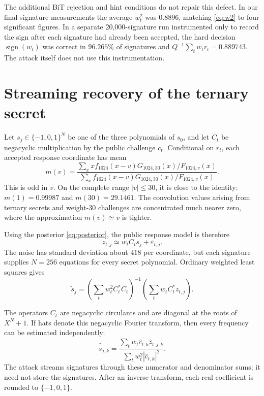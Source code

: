 \documentclass[11pt,a4paper]{article}
\begin{document}
The additional BiT rejection and hint conditions do not repair this defect.
In our final-signature measurements the average $w_t^2$ was $0.8896$, matching
\eqref{eq:w2} to four significant figures.  In a separate 20,000-signature
run instrumented only to record the sign after each signature had already been
accepted, the hard decision $\operatorname{sign}(w_t)$ was correct in
$96.265\%$ of signatures and $Q^{-1}\sum_t w_tr_t=0.889743$.  The attack itself
does not use this instrumentation.

\section{Streaming recovery of the ternary secret}

Let $s_j\in\{-1,0,1\}^{N}$ be one of the three polynomials of $s_0$, and let
$C_t$ be negacyclic multiplication by the public challenge $c_t$.  Conditional
on $r_t$, each accepted response coordinate has mean
\begin{equation}
 m(v)=
 \frac{\sum_x x f_{1024}(x-v)G_{1024,30}(x)/F_{1024,v}(x)}
      {\sum_x   f_{1024}(x-v)G_{1024,30}(x)/F_{1024,v}(x)}.
 \label{eq:m-v}
\end{equation}
This is odd in $v$.  On the complete range $|v|\leq30$, it is close to the
identity: $m(1)=0.99987$ and $m(30)=29.1461$.  The convolution values arising
from ternary secrets and weight-30 challenges are concentrated much nearer
zero, where the approximation $m(v)\simeq v$ is tighter.

Using the posterior \eqref{eq:posterior}, the public response model is therefore
\begin{equation}
                 z_{t,j}\simeq w_t C_t s_j+\varepsilon_{t,j}.
 \label{eq:regression}
\end{equation}
The noise has standard deviation about $418$ per coordinate, but each
signature supplies $N=256$ equations for every secret polynomial.  Ordinary
weighted least squares gives
\begin{equation}
 \widetilde s_j=
 \left(\sum_t w_t^2C_t^*C_t\right)^{-1}
 \left(\sum_t w_tC_t^*z_{t,j}\right).
 \label{eq:normal}
\end{equation}

The operators $C_t$ are negacyclic circulants and are diagonal at the roots of
$X^N+1$.  If hats denote this negacyclic Fourier transform, then every
frequency can be estimated independently:
\begin{equation}
 \widehat{\widetilde s}_{j,k}=
 \frac{\sum_t w_t\overline{\widehat c_{t,k}}\widehat z_{t,j,k}}
      {\sum_t w_t^2|\widehat c_{t,k}|^2}.
 \label{eq:fourier-estimator}
\end{equation}
The attack streams signatures through these numerator and denominator sums;
it need not store the signatures.  After an inverse transform, each real
coefficient is rounded to $\{-1,0,1\}$.
\end{document}

